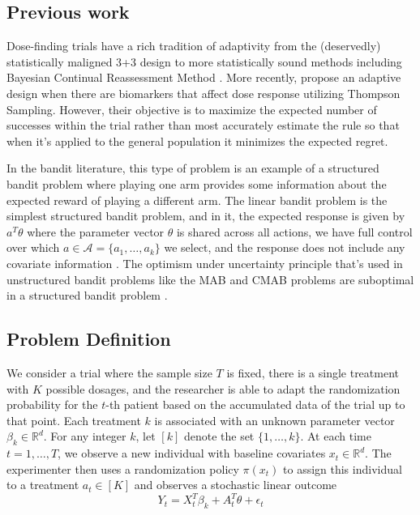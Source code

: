 \documentclass[12pt,,letterpaper,twoside]{report}
\begin{document}
\subsection{Previous work}

Dose-finding trials have a rich tradition of adaptivity from the
(deservedly) statistically maligned 3+3 design to more statistically
sound methods including Bayesian Continual Reassessment Method
\cite{o1990continual, goodman1995some}. More recently,
\cite{guo2017bayesian} propose an adaptive design when there are
biomarkers that affect dose response utilizing Thompson Sampling.
However, their objective is to maximize the expected number of successes
within the trial rather than most accurately estimate the rule so that
when it's applied to the general population it minimizes the expected
regret.

In the bandit literature, this type of problem is an example of a
structured bandit problem where playing one arm provides some
information about the expected reward of playing a different arm. The
linear bandit problem is the simplest structured bandit problem, and in
it, the expected response is given by \(a^T \theta\) where the parameter
vector \(\theta\) is shared across all actions, we have full control
over which \(a \in \mathcal{A} = \{a_1, \ldots, a_k\}\) we select, and
the response does not include any covariate information
\cite{xu2018fully}. The optimism under uncertainty principle that's used
in unstructured bandit problems like the MAB and CMAB problems are
suboptimal in a structured bandit problem \citep{lattimore2017end}.

\subsection{Problem Definition}

We consider a trial where the sample size \(T\) is fixed, there is a
single treatment with \(K\) possible dosages, and the researcher is able
to adapt the randomization probability for the \(t\)-th patient based on
the accumulated data of the trial up to that point. Each treatment \(k\)
is associated with an unknown parameter vector
\(\beta_k \in \mathbb{R}^d\). For any integer \(k\), let \([k]\) denote
the set \(\{1, \ldots, k \}\). At each time \(t = 1, \ldots, T\), we
observe a new individual with baseline covariates
\(x_t \in \mathbb{R}^d\). The experimenter then uses a randomization
policy \(\pi(x_t)\) to assign this individual to a treatment
\(a_t \in [K]\) and observes a stochastic linear outcome
\[Y_{t} = X_t^T \beta_k + A_t^T\theta + \epsilon_{t}\]
\end{document}
